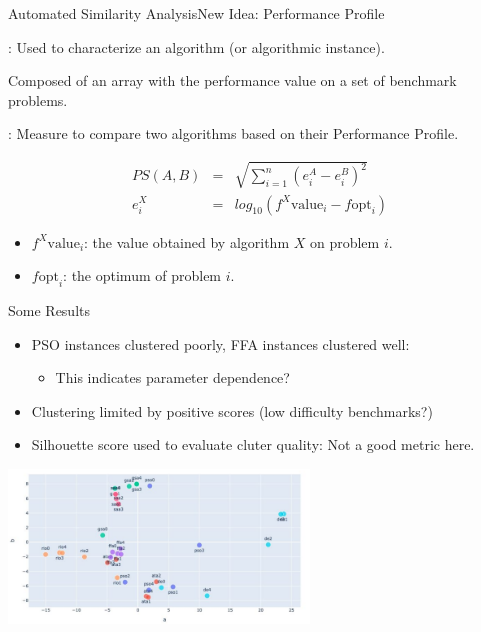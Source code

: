 \documentclass[aspectratio=169]{beamer}
\begin{document}
\begin{frame}{Automated Similarity Analysis}{New Idea: Performance Profile}

  : Used to characterize an algorithm
  (or algorithmic instance).

  Composed of an array with the performance value on a set of benchmark problems.\bigskip

  : Measure to compare two
  algorithms based on their Performance Profile.

  \begin{eqnarray*}
    PS(A,B) &=& \sqrt{\sum^n_{i=1}(e^A_i - e^B_i)^2}\\
    e^X_i&=&log_{10}(f^X\text{value}_i - f\text{opt}_i)
  \end{eqnarray*}

  \begin{itemize}
  \item $f^X\text{value}_i$: the value obtained by algorithm $X$ on problem $i$.\\
  \item $f\text{opt}_i$: the optimum of problem $i$.\\
  \end{itemize}

\end{frame}

\begin{frame}{Some Results}
  \begin{itemize}
  \item PSO instances clustered poorly, FFA instances clustered well:
    \begin{itemize}
    \item This indicates parameter dependence?
    \end{itemize}
  \item Clustering limited by positive scores (low difficulty benchmarks?)
  \item Silhouette score used to evaluate cluter quality: Not a good metric here.
  \end{itemize}

  \begin{center}
    \includegraphics[width=0.6\textwidth]{img/jair_cluster_result.png}
  \end{center}
\end{frame}
\end{document}
